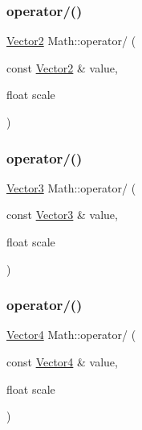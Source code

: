 \mbox{\label{namespace_math_ac1d2e4f5c5d22414afbcdc056e957318}} 
\subsubsection{\texorpdfstring{operator/()}{operator/()}\hspace{0.1cm}{\footnotesize\ttfamily [1/7]}}
{\footnotesize\ttfamily \mbox{\hyperlink{struct_math_1_1_vector2}{Vector2}} Math\+::operator/ (\begin{DoxyParamCaption}\item[{const \mbox{\hyperlink{struct_math_1_1_vector2}{Vector2}} \&}]{value,  }\item[{float}]{scale }\end{DoxyParamCaption})}

\mbox{\label{namespace_math_a47b5ce1ab6c1fd8b4163dbe17fc2c8bc}} 
\subsubsection{\texorpdfstring{operator/()}{operator/()}\hspace{0.1cm}{\footnotesize\ttfamily [2/7]}}
{\footnotesize\ttfamily \mbox{\hyperlink{struct_math_1_1_vector3}{Vector3}} Math\+::operator/ (\begin{DoxyParamCaption}\item[{const \mbox{\hyperlink{struct_math_1_1_vector3}{Vector3}} \&}]{value,  }\item[{float}]{scale }\end{DoxyParamCaption})}

\mbox{\label{namespace_math_a22a570ffffa9a4508274b38d5f26da25}} 
\subsubsection{\texorpdfstring{operator/()}{operator/()}\hspace{0.1cm}{\footnotesize\ttfamily [3/7]}}
{\footnotesize\ttfamily \mbox{\hyperlink{struct_math_1_1_vector4}{Vector4}} Math\+::operator/ (\begin{DoxyParamCaption}\item[{const \mbox{\hyperlink{struct_math_1_1_vector4}{Vector4}} \&}]{value,  }\item[{float}]{scale }\end{DoxyParamCaption})}

